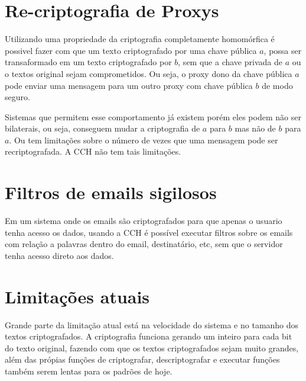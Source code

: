 \section{Re-criptografia de Proxys}
Utilizando uma propriedade da criptografia completamente homomórfica é possivel fazer com que um texto criptografado por uma chave pública $a$, possa ser transaformado em um texto criptografado por $b$, sem que a chave privada de $a$ ou o textos original sejam comprometidos.
Ou seja, o proxy dono da chave pública $a$ pode enviar uma mensagem para um outro proxy com chave pública $b$ de modo seguro.
	
Sistemas que permitem esse comportamento já existem porém eles podem não ser bilaterais, ou seja, conseguem mudar a criptografia de $a$ para $b$ mas não de $b$ para $a$. Ou tem limitações sobre o número de vezes que uma mensagem pode ser recriptografada. A CCH não tem tais limitações.

\section{Filtros de emails sigilosos}
Em um sistema onde os emails são criptografados para que apenas o usuario tenha acesso os dados, usando a CCH é possível executar filtros sobre os emails com relação a palavras dentro do email, destinatário, etc, sem que o servidor tenha acesso direto aos dados.
	
\section{Limitações atuais}
Grande parte da limitação atual está na velocidade do sistema e no tamanho dos textos criptografados. A criptografia funciona gerando um inteiro para cada bit do texto original, fazendo com que os textos criptografados sejam muito grandes, além das própias funções de criptografar, descriptografar e executar funções também serem lentas para os padrões de hoje.